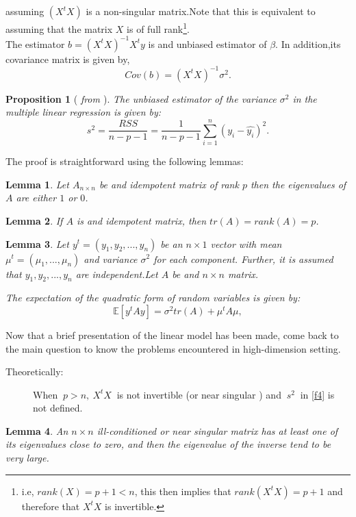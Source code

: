 \documentclass[12pt]{report}
\newtheorem {lemme}{Lemma} %
\newtheorem {proposition}{Proposition}[section]  %
\begin{document}
assuming $(X^{t}X)$ is a non-singular matrix.Note that this is equivalent to assuming that the matrix $X$ is of full rank\footnote{i.e, $rank(X)=p+1<n$, this then implies that $rank(X^{t}X)=p+1$ and therefore that $X^{t}X$ is invertible.}.\\
The estimator $b=(X^{t}X)^{-1}X^{t}y$ is and unbiased estimator of $\beta$. In addition,its covariance matrix is given by,
\begin{equation}
	 Cov(b)=(X^{t}X)^{-1}\sigma^{2}.\label{10}
\end{equation}
\begin{proposition}[ \textit{ from \cite{ref4}} ]
	The unbiased estimator of the variance $\sigma^{2}$ in the multiple linear regression is given by:
	\begin{equation}
		s^{2}=\frac{RSS}{n-p-1}=\frac{1}{n-p-1}\sum_{i=1}^{n}(y_{i}-\hat{y_{i}})^{2}.
		\label{f4}
	\end{equation}
\end{proposition}
	The proof is straightforward using the following lemmas:
\begin{lemme}
	Let $A_{n\times n}$ be and idempotent matrix of rank $p$ then the eigenvalues of $A$ are either $1$ or $0$.
\end{lemme}
	\begin{lemme}
	If $A$ is and idempotent matrix, then $tr(A)=rank(A)=p$.
\end{lemme}
	\begin{lemme}
	Let $y^{t}=(y_{1},y_{2},...,y_{n})$ be an $n\times 1$ vector with mean $\mu^{t}=(\mu_{1},...,\mu_{n})$ and variance $\sigma^{2}$  for each component. Further, it is assumed that $y_{1},y_{2},...,y_{n}$ are independent.Let $A$ be and $n\times n$ matrix.
	
	The expectation of the quadratic form of random variables is given by:
	\begin{equation}
		\mathbb{E}[y^{t}Ay]=\sigma^{2}tr(A)+\mu^{t}A\mu ,
		\label{f5}
	\end{equation}
\end{lemme}
	Now that a brief presentation of the linear model has been made, come back to the main question to know the problems encountered in high-dimension setting.
\begin{description}
	\item[Theoretically:] When $\ p>n,\ X^{t}X\ $ is not invertible (or near singular ) and $\ s^{2}\ $ in \eqref{f4} is not defined.
\end{description}
	\begin{lemme}
	An $n\times n$ ill-conditioned or near singular matrix has at least one of its eigenvalues close to zero, and then the eigenvalue of the inverse tend to be very large.
\end{lemme}	 
\end{document}

